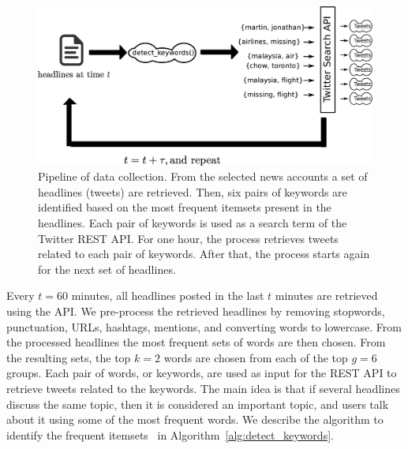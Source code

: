 \begin{figure}
\begin{center}
\includegraphics[width=\textwidth]{figures/data/data_collection_1}
\caption[Pipeline of data collection]{Pipeline of data collection. From the
  selected news accounts a set of headlines (tweets) are retrieved. Then, six
  pairs of keywords are identified based on the most frequent itemsets present
  in the headlines. Each pair of keywords is used as a search term of the
  Twitter REST API. For one hour, the process retrieves tweets related to each
  pair of keywords. After that, the process starts again for the next set of
  headlines.}
\label{fig:pipeline}
\end{center}
\end{figure}



Every $t=60$ minutes, all headlines posted in the last $t$ minutes are
retrieved using the API. 
%
We pre-process the retrieved headlines by removing stopwords, punctuation, URLs,
hashtags, mentions, and converting words to lowercase.
%
From the processed headlines the most frequent sets of words are then chosen.
%
From the resulting sets, the top $k=2$ words are chosen from each of the top
$g=6$ groups. 
%
Each pair of words, or keywords, are used as input for the REST API to retrieve
tweets related to the keywords. 
%
The main idea is that if several headlines discuss the same topic, then it is
considered an important topic, and users talk about it using some of the most
frequent words. 
%
We describe the algorithm to identify the frequent
itemsets~\cite{zaki2000scalable} in Algorithm~\ref{alg:detect_keywords}.
%


\renewcommand{\algorithmicrequire}{\textbf{Input:}}
\renewcommand{\algorithmicensure}{\textbf{Output:}}
\newcommand{\I}{\mathcal{I}}
\renewcommand{\G}{\mathcal{G}}
\newcommand{\ess}{\mathcal{S}}

